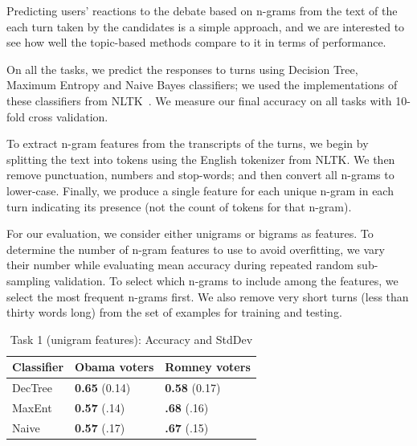 
Predicting users' reactions to the debate based on n-grams from the text of the each turn taken by the candidates is a simple approach, and we are interested to see how well the topic-based methods compare to it in terms of performance.

On all the tasks, we predict the responses to turns using Decision Tree, Maximum Entropy and Naive Bayes classifiers; we used the implementations of these classifiers from NLTK~\cite{bird_nltk:_2006}.  We measure our final accuracy on all tasks with 10-fold cross validation.  

To extract n-gram features from the transcripts of the turns, we begin by splitting the text into tokens using the English tokenizer from NLTK.  We then remove punctuation, numbers and stop-words; and then convert all n-grams to lower-case.  Finally, we produce a single feature for each unique n-gram in each turn indicating its presence (not the count of tokens for that n-gram).  

For our evaluation, we consider either unigrams or bigrams as features.  To determine the number of n-gram features to use to avoid overfitting, we vary their number while evaluating mean accuracy during repeated random sub-sampling validation.  To select which n-grams to include among the features, we select the most frequent n-grams first.  We also remove very short turns (less than thirty words long) from the set of examples for training and testing.

\begin{table}[]
\begin{centering}
\begin{tabular}{ l | l | l }
Classifier & Obama voters & Romney voters \\
\hline
DecTree & \textbf{0.65} (0.14) &  \textbf{0.58} (0.17) \\
MaxEnt & \textbf{0.57} (.14) &  \textbf{.68} (.16) \\
Naive & \textbf{0.57} (.17) &  \textbf{.67} (.15) \\
\end{tabular}
\caption{Task 1 (unigram features): Accuracy and StdDev}
\label{tab:task1unigrams}
\end{centering}
\end{table}

